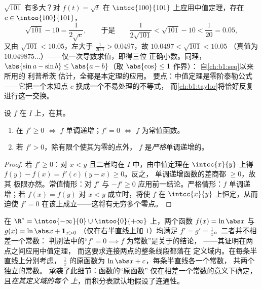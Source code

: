 \begin{example}[作为估计工具的中值定理]\label{ex:b1:derivative:mvtestimate}
$\sqrt{101}$ 有多大？对 $f(t) = \sqrt t$
在 $\intcc{100}{101}$ 上应用中值定理，存在 $c \in \intoo{100}{101}$，
\[
\sqrt{101} - 10 = \frac{1}{2\sqrt c},
\qquad\text{于是}\qquad
\frac{1}{2\sqrt{101}} < \sqrt{101} - 10 < \frac{1}{20} = 0.05 ,
\]
又由 $\sqrt{101} < 10.05$，左大于
$\frac{1}{20.1} > 0.0497$，故 $10.0497 < \sqrt{101} < 10.05$
（真值为 $10.049875\dots$）——仅一次导数求值，即得三位
正确小数。同理，$\abs{\sin a - \sin b} \leq
\abs{a - b}$（取 $\abs{\cos}\leq 1$ 作界）：
自\cref{ch:b1:seq}以来所用的 利普希茨 估计，全都是本定理的应用。
要点：中值定理是零阶泰勒公式
——它把一个未知点 $c$ 换成一个不易处理的不等式，
而\cref{ch:b1:taylor}将恰好反复进行这一交换。
\end{example}

\begin{corollary}[单调性判别法]\label{cor:b1:derivative:monotone}
设 $f$ 在 $I$ 上，在其。
\begin{enumerate}
  \item 在 $f' \geq 0$ $\iff$ $f$ 单调递增；$f' = 0$
        $\iff$ $f$ 为常值函数。
  \item 若 $f' > 0$，除有限个使其为零的点外，
        $f$ 是\emph{严格}单调递增的。
\end{enumerate}
\end{corollary}

\begin{proof}
若 $f' \geq 0$：对 $x < y$ 且二者均在 $I$ 中，由中值定理在
$\intcc{x}{y}$ 上得 $f(y) - f(x) = f'(c)(y - x) \geq 0$。反之，
单调递增函数的差商都 $\geq 0$，故其
极限亦然。常值情形：对 $f'$ 与
$-f' \geq 0$ 应用前一结论。严格情形：$f$ 单调递增；若 $f(x) =
f(y)$ 对 $x < y$ 成立时，将使 $f$ 在 $\intcc{x}{y}$ 上恒定，从而迫使 $f' =
0$ 在该上成立——这将有无穷多个零点。
\end{proof}

\begin{example}\label{ex:b1:derivative:intervalmatters}
在 $\R^* = \intoo{-\infty}{0} \cup \intoo{0}{+\infty}$ 上，两个函数
$f(x) = \ln\abs x$ 与 $g(x) = \ln\abs x + \mathbf{1}_{x>0}$
（仅在右半直线上加 $1$）均满足 $f' = g' =
\frac1x$。二者并不相差一个常数：
判别法中的“$f' = 0 \implies f$ 为常数”是关于\emph{}的结论，
——其证明在两点之间应用中值定理，
而这要求连接两点的整条线段都落在
定义域内。在每条半直线上分别考虑，
$\frac1x$ 的原函数为 $\ln\abs x + c$，每条半直线各一个常数，
共两个独立的常数。
承袭了此细节：函数的“原函数”
仅在相差一个常数的意义下确定，且\emph{在其定义域的每个
上}，而积分表默认地假设了连通性。
\end{example}

